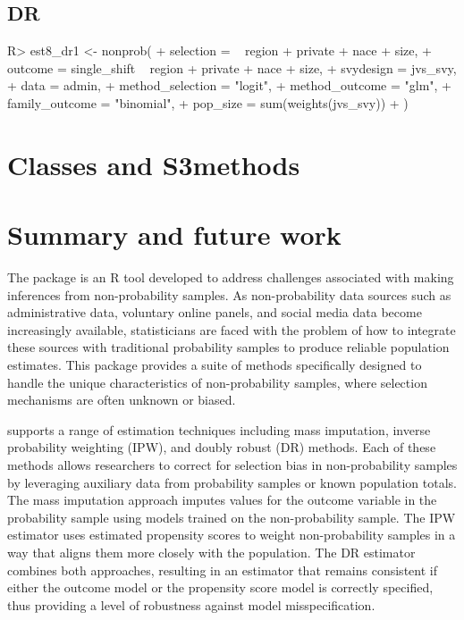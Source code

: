 \documentclass[
]{jss}
\begin{document}
\subsection{DR}\label{dr}

\begin{CodeChunk}
\begin{CodeInput}
R> est8_dr1 <- nonprob(
+   selection = ~ region + private + nace + size,
+   outcome = single_shift ~ region + private + nace + size,
+   svydesign = jvs_svy,
+   data = admin,
+   method_selection = "logit",
+   method_outcome = "glm",
+   family_outcome = "binomial",
+   pop_size = sum(weights(jvs_svy))
+ )
\end{CodeInput}
\end{CodeChunk}

\section{Classes and S3methods}\label{classes-and-s3methods}

\section{Summary and future work}\label{summary-and-future-work}

The  package is an R tool developed to address
challenges associated with making inferences from non-probability
samples. As non-probability data sources such as administrative data,
voluntary online panels, and social media data become increasingly
available, statisticians are faced with the problem of how to integrate
these sources with traditional probability samples to produce reliable
population estimates. This package provides a suite of methods
specifically designed to handle the unique characteristics of
non-probability samples, where selection mechanisms are often unknown or
biased.

 supports a range of estimation techniques including
mass imputation, inverse probability weighting (IPW), and doubly robust
(DR) methods. Each of these methods allows researchers to correct for
selection bias in non-probability samples by leveraging auxiliary data
from probability samples or known population totals. The mass imputation
approach imputes values for the outcome variable in the probability
sample using models trained on the non-probability sample. The IPW
estimator uses estimated propensity scores to weight non-probability
samples in a way that aligns them more closely with the population. The
DR estimator combines both approaches, resulting in an estimator that
remains consistent if either the outcome model or the propensity score
model is correctly specified, thus providing a level of robustness
against model misspecification.
\end{document}
